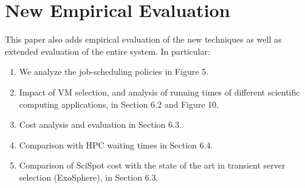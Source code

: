 \documentclass{article}
\begin{document}
\section{New Empirical Evaluation}

This paper also adds empirical evaluation of the new techniques as well as extended evaluation of the entire system. In particular:

\begin{enumerate}
\item We analyze the job-scheduling policies in Figure 5. 
\item Impact of VM selection, and analysis of running times of different scientific computing applications, in Section 6.2 and Figure 10.
\item Cost analysis and evaluation in Section 6.3. 
\item Comparison with HPC waiting times in Section 6.4. 
\item Comparison of SciSpot cost with the state of the art in transient server selection (ExoSphere), in Section 6.3. 
\end{enumerate}
\end{document}
